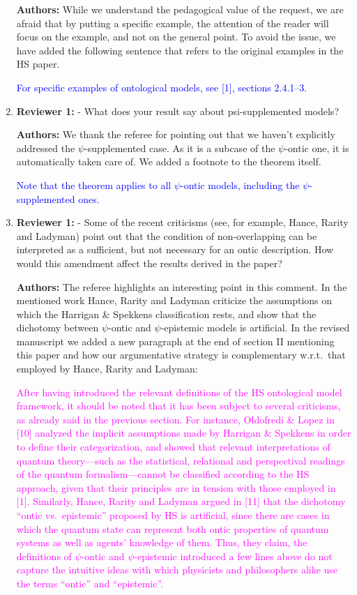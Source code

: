 \documentclass[11pt, executivepaper]{article}
\begin{document}
\begin{enumerate}
\textbf{Authors:} While we understand the pedagogical value of the request, we are afraid that by putting a specific example, the attention of the reader will focus on the example, and not on the general point. To avoid the issue, we have added the following sentence that refers to the original examples in the HS paper.

\textcolor{blue}{ For specific examples of ontological models, see [1], sections 2.4.1--3. }

\item \textbf{Reviewer 1:} - What does your result say about psi-supplemented models?
\vspace{2mm}

\textbf{Authors:} We thank the referee for pointing out that we haven't explicitly addressed the $\psi$-supplemented case. As it is a subcase of the $\psi$-ontic one, it is automatically taken care of. We added a footnote to the theorem itself.

\textcolor{blue}{ Note that the theorem applies to all $\psi$-ontic models, including the $\psi$-supplemented ones.}


\item \textbf{Reviewer 1:} - Some of the recent criticisms (see, for example, Hance, Rarity and Ladyman) point out that the condition of non-overlapping can be interpreted as a sufficient, but not necessary for an ontic description. How would this amendment affect the results derived in the paper?
\vspace{2mm}

\textbf{Authors:} The referee highlights an interesting point in this comment. In the mentioned work Hance, Rarity and Ladyman criticize the assumptions on which the Harrigan \& Spekkens classification rests, and show that the dichotomy between $\psi$-ontic and $\psi$-epistemic models is artificial. In the revised manuscript we added a new paragraph at the end of section II mentioning this paper and how our argumentative strategy is complementary w.r.t.\ that employed by Hance, Rarity and Ladyman:

\textcolor{magenta}{After having introduced the relevant definitions of the HS ontological model framework, it should be noted that it has been subject to several criticisms, as already said in the previous section. For instance, Oldofredi \& Lopez in [10] analyzed the implicit assumptions made by Harrigan \& Spekkens in order to define their categorization, and showed that relevant interpretations of quantum theory---such as the statistical, relational and perspectival readings of the quantum formalism---cannot be classified according to the HS approach, given that their principles are in tension with those employed in [1]. Similarly, Hance, Rarity and Ladyman argued in [11] that the dichotomy ``ontic vs.\ epistemic'' proposed by HS is artificial, since there are cases in which the quantum state can represent both ontic properties of quantum systems as well as agents' knowledge of them. Thus, they claim, the definitions of $\psi$-ontic and $\psi$-epistemic introduced a few lines above do not capture the intuitive ideas with which physicists and philosophers alike use the terms ``ontic'' and ``epistemic''.}


\end{enumerate}
\end{document}
